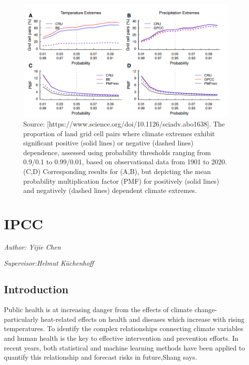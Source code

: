 \documentclass[
]{krantz}
\begin{document}
\vspace{1em}
\begin{figure}

{\centering \includegraphics[width=0.8\linewidth]{work/06-anthropo/figures/sensitivity} 

}

\caption{Source: [https://www.science.org/doi/10.1126/sciadv.abo1638]. The proportion of land grid cell pairs where climate extremes exhibit significant positive (solid lines) or negative (dashed lines) dependence, assessed using probability thresholds ranging from 0.9/0.1 to 0.99/0.01, based on observational data from 1901 to 2020. (C,D) Corresponding results for (A,B), but depicting the mean probability multiplication factor (PMF) for positively (solid lines) and negatively (dashed lines) dependent climate extremes.}\label{fig:unnamed-chunk-11}
\end{figure}
\vspace{1em}

\chapter{IPCC}\label{ipcc}

\emph{Author: Yijie Chen}

\emph{Supervisor:Helmut Küchenhoff}

\section{Introduction}\label{introduction-3}

Public health is at increasing danger from the effects of climate change-particularly heat-related effects on health and diseases which increase with rising temperatures. To identify the complex relationships connecting climate variables and human health is the key to effective intervention and prevention efforts. In recent years, both statistical and machine learning methods have been applied to quantify this relationship and forecast risks in future,Shang says.
\end{document}
